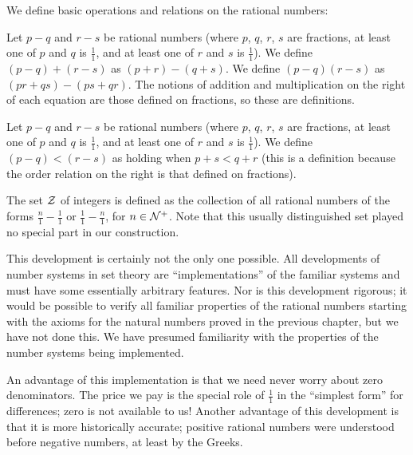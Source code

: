 We define basic operations and relations on the rational
numbers:

\begin{definition}
 Let $p-q$ and $r-s$ be rational numbers (where $p$,
 $q$, $r$, $s$ are fractions, at least one of $p$ and $q$ is $\frac11$, and at least one of $r$ and $s$ is $\frac11$).  We define $(p-q) + (r-s)$ as
 $(p+r)-(q+s)$.  We define $(p-q)(r-s)$ as $(pr+qs)-(ps+qr)$.  The
 notions of addition and
 multiplication on the right of each
 equation are those defined on fractions, so these are
 definitions.
\end{definition}

\begin{definition}
 Let $p-q$ and $r-s$ be rational numbers (where $p$,
 $q$, $r$, $s$ are fractions, at least one of $p$ and $q$ is $\frac11$, and at least one of $r$ and $s$ is $\frac11$).  We define $(p-q) < (r-s)$ as holding
 when $p+s < q+r$ (this is a definition because the order
 relation on the right is that defined on fractions).
\end{definition}

\begin{definition}
 The set ${\cal Z}$ of {\upshape integers} is defined
 as the collection of all rational numbers of the forms $\frac n1 -
 \frac 11$ or $\frac 11 - \frac n1$, for $n \in {\cal N}^+$.  Note that
 this usually distinguished set played no special part in our
 construction.
\end{definition}

This development is certainly not the only one possible.  All
developments of number systems in set theory are ``implementations''
of the familiar systems and must have some essentially arbitrary
features.  Nor is this development rigorous; it would be possible to
verify all familiar properties of the rational numbers starting with
the axioms for the natural numbers proved in the previous
chapter, but we have not done this.  We have presumed familiarity with the
properties of the number systems being implemented.

An advantage of this implementation is that we need never worry about
zero denominators.  The price we pay is the special role of $\frac 11$
in the ``simplest form'' for differences; zero is not available to us!
Another advantage of this development is that it is more historically
accurate; positive rational numbers were understood
before negative numbers, at least by the Greeks.






